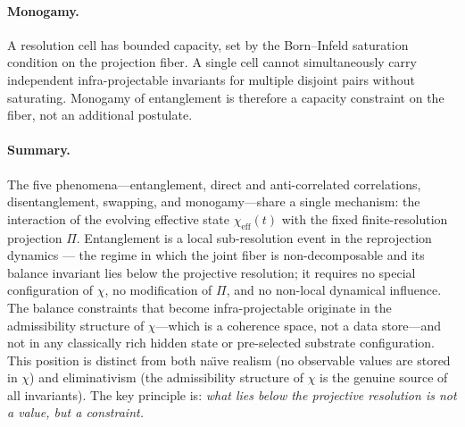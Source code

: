   \paragraph{Monogamy.}
    A resolution cell has bounded capacity, set by the Born--Infeld saturation
    condition on the projection fiber.
    A single cell cannot simultaneously carry independent infra-projectable
    invariants for multiple disjoint pairs without saturating.
    Monogamy of entanglement is therefore a capacity constraint on the fiber,
    not an additional postulate.

  \paragraph{Summary.}
    The five phenomena---entanglement, direct and anti-correlated correlations,
    disentanglement, swapping, and monogamy---share a single mechanism: the
    interaction of the evolving effective state $\chi_{\mathrm{eff}}(t)$ with
    the fixed finite-resolution projection $\Pi$.
    Entanglement is a local sub-resolution event in the reprojection dynamics
    --- the regime in which the joint fiber is non-decomposable and its balance
    invariant lies below the projective resolution; it requires no special
    configuration of $\chi$, no modification of $\Pi$, and no non-local
    dynamical influence.
    The balance constraints that become infra-projectable originate in the
    admissibility structure of $\chi$---which is a coherence space, not a data
    store---and not in any classically rich hidden state or pre-selected
    substrate configuration.
    This position is distinct from both na\"{\i}ve realism (no observable values
    are stored in $\chi$) and eliminativism (the admissibility structure of
    $\chi$ is the genuine source of all invariants).
    The key principle is: \emph{what lies below the projective resolution is
not a value, but a constraint.}
